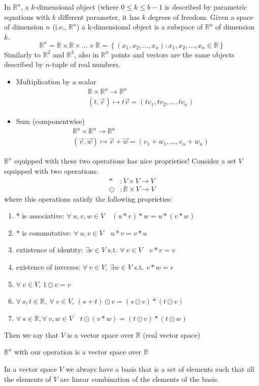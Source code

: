 In $\mathbb{R}^n$, a $k$-dimensional object (where $0 \le k \le b-1$ is described by parametric equations with $k$ different parameter, it has $k$ degrees of freedom. Given a space of dimension $n$ (i.e., $\mathbb{R}^n$) a k-dimensional object is a subspace of $\mathbb{R}^n$ of dimension $k$. 
$$\mathbb{R}^n = \mathbb{R} \times \mathbb{R} \times \dots \times \mathbb{R}= \left\{ (x_1, x_2, \dots, x_n): x_1, x_2, \dots, x_n \in \mathbb{R} \right\} $$
Similarly to $\mathbb{R}^2$ and $\mathbb{R}^3$, also in $\mathbb{R}^n$ points and vectors are the same objects described by $n$-tuple of real numbers.
\begin{itemize}
    \item Multiplication by a scalar
    \begin{align*}
        &\mathbb{R} \times \mathbb{R}^n \longrightarrow \mathbb{R}^n\\
        &(t, \vec v) \longmapsto t \vec v = (tv_1, tv_2, \dots, tv_n)
    \end{align*}
    \item Sum (componentwise)
    \begin{align*}
        &\mathbb{R}^n \times\mathbb{R}^n \longrightarrow \mathbb{R}^n \\
        &(\vec v, \vec w) \longmapsto \vec v + \vec w = (v_1+w_1, \dots, v_n+w_n)
    \end{align*}
\end{itemize}
$\mathbb{R}^n$ equipped with these two operations has nice proprieties! Consider a set $V$ equipped with two operations:
\begin{align*}
    *&: V \times V \longrightarrow V\\
    \odot &: \mathbb{R} \times V \longrightarrow V
\end{align*}
where this operations satisfy the following proprieties:
\begin{enumerate}
    \item $*$ is associative: $\forall \ u,v,w \in V \quad (u*v)*w = u*(v*w)$
    \item $*$ is commutative: $\forall \ u,v \in V \quad u*v = v*u$
    \item extistence of identity: $\exists e \in V$ s.t. $\forall \ v \in V \quad e*v=v$
    \item existence of inverses: $\forall \ v \in V,\ \exists w \in V$ s.t. $v*w = e$
    \item $\forall \ v \in V$, $1\odot v = v$
    \item $\forall \ s,t \in \mathbb{R}, \ \forall \ v \in V$, \quad $(s+t) \odot v = (s \odot v) * (t \odot v)$
    \item $\forall \ s \in \mathbb{R}, \forall \ v,w \in V \quad t \odot (v*w)=(t\odot v) * (t \odot w)$
\end{enumerate}
Then we say that $V$ is a vector space over $\mathbb{R}$ (real vector space)
\begin{remark}[Remark]
    $\mathbb{R}^n$ with our operation is a vector space over $\mathbb{R}$
\end{remark}
In a vector space $V$ we always have a basis that is a set of elements such that all the elements of $V$ are linear combination of the elements of the basis.

